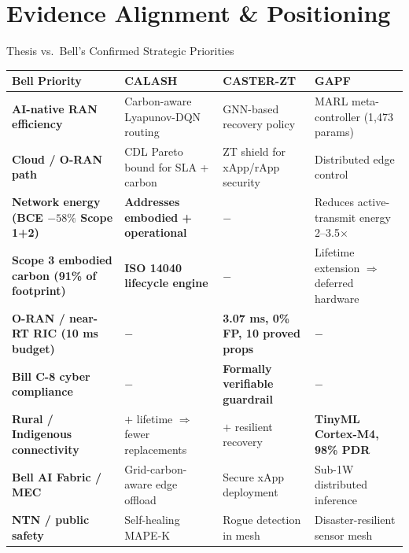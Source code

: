 \documentclass[aspectratio=169, 11pt]{beamer}
\begin{document}
\section{Evidence Alignment \& Positioning}

\begin{frame}{Thesis vs.\ Bell's Confirmed Strategic Priorities}

\centering
\renewcommand{\arraystretch}{1.25}
\scriptsize
\begin{tabularx}{\linewidth}{>{\bfseries}p{3.0cm} X X X}
\toprule
\textbf{Bell Priority} & \textbf{CALASH} & \textbf{CASTER-ZT} & \textbf{GAPF} \\
\midrule
AI-native RAN efficiency & Carbon-aware Lyapunov-DQN routing & GNN-based recovery policy & MARL meta-controller (1,473 params) \\
\addlinespace
Cloud / O-RAN path & CDL Pareto bound for SLA + carbon & ZT shield for xApp/rApp security & Distributed edge control \\
\addlinespace
Network energy (BCE $-58\%$ Scope 1+2) & \cellcolor{polygreen!20}\textbf{Addresses embodied + operational} & $-$ & Reduces active-transmit energy 2–3.5$\times$ \\
\addlinespace
Scope 3 embodied carbon (91\% of footprint) & \cellcolor{polygreen!20}\textbf{ISO 14040 lifecycle engine} & $-$ & Lifetime extension $\Rightarrow$ deferred hardware \\
\addlinespace
O-RAN / near-RT RIC (10 ms budget) & $-$ & \cellcolor{bellred!15}\textbf{3.07 ms, 0\% FP, 10 proved props} & $-$ \\
\addlinespace
Bill C-8 cyber compliance & $-$ & \cellcolor{bellred!15}\textbf{Formally verifiable guardrail} & $-$ \\
\addlinespace
Rural / Indigenous connectivity & $+$ lifetime $\Rightarrow$ fewer replacements & $+$ resilient recovery & \cellcolor{bellblue!15}\textbf{TinyML Cortex-M4, 98\% PDR} \\
\addlinespace
Bell AI Fabric / MEC & Grid-carbon-aware edge offload & Secure xApp deployment & Sub-1W distributed inference \\
\addlinespace
NTN / public safety & Self-healing MAPE-K & Rogue detection in mesh & Disaster-resilient sensor mesh \\
\bottomrule
\end{tabularx}

\vspace{6pt}

\end{frame}
\end{document}
